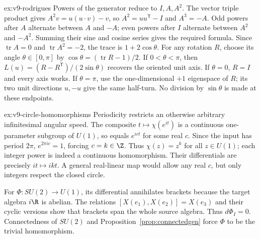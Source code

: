 \begin{solution}{ex:v9-rodrigues}
\idea Powers of the generator reduce to $I,A,A^2$.
\writeup The vector triple product gives
$A^2v=u(u\cdot v)-v$, so $A^2=uu^{\mathsf T}-I$ and $A^3=-A$.
Odd powers after $A$ alternate between $A$ and $-A$;
even powers after $I$ alternate between $A^2$ and $-A^2$.
Summing their sine and cosine series gives the required formula.
Since $\operatorname{tr}A=0$ and $\operatorname{tr}A^2=-2$,
the trace is $1+2\cos\theta$.
For any rotation $R$, choose its angle $\theta\in[0,\pi]$ by
$\cos\theta=(\operatorname{tr}R-1)/2$.
If $0<\theta<\pi$, then
$L(u)=(R-R^{\mathsf T})/(2\sin\theta)$ recovers the oriented unit axis.
If $\theta=0$, $R=I$ and every axis works.
If $\theta=\pi$, use the one-dimensional $+1$ eigenspace of $R$;
its two unit directions $u,-u$ give the same half-turn.
No division by $\sin\theta$ is made at these endpoints.
\end{solution}
\begin{solution}{ex:v9-circle-homomorphisms}
\idea Periodicity restricts an otherwise arbitrary infinitesimal angular speed.
\writeup The composite $t\mapsto\chi(e^{it})$ is a continuous
one-parameter subgroup of $U(1)$, so equals $e^{ict}$ for some real $c$.
Since the input has period $2\pi$, $e^{2\pi ic}=1$, forcing $c=k\in\Z$.
Thus $\chi(z)=z^k$ for all $z\in U(1)$; each integer power is indeed a
continuous homomorphism. Their differentials are precisely $it\mapsto ikt$.
A general real-linear map would allow any real $c$, but only integers
respect the closed circle.

For $\Phi:SU(2)\to U(1)$, its differential annihilates brackets because
the target algebra $i\R$ is abelian. The relations
$[X(e_1),X(e_2)]=X(e_3)$ and their cyclic versions show that brackets
span the whole source algebra. Thus $d\Phi_I=0$.
Connectedness of $SU(2)$ and Proposition~\ref{prop:connectedgen} force
$\Phi$ to be the trivial homomorphism.
\end{solution}
